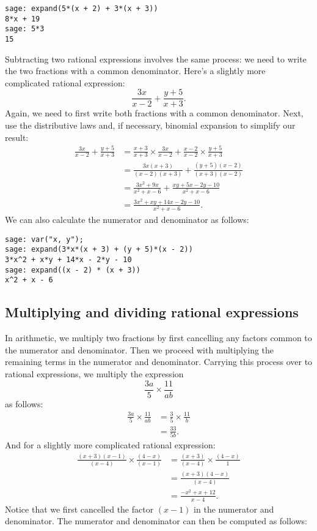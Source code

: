 \begin{lstlisting}
sage: expand(5*(x + 2) + 3*(x + 3))
8*x + 19
sage: 5*3
15
\end{lstlisting}

Subtracting two rational
expressions involves the same process: we need to write the two
fractions with a common denominator. Here's a slightly more
complicated rational expression:
\[
\frac{3x}{x - 2} + \frac{y + 5}{x + 3}.
\]
Again, we need to first write both fractions with a common
denominator. Next, use the distributive laws and, if necessary,
binomial expansion to simplify our result:
%
\begin{align*}
\frac{3x}{x - 2} + \frac{y + 5}{x + 3}
&=
\frac{x + 3}{x + 3} \times \frac{3x}{x - 2}
+
\frac{x - 2}{x - 2} \times \frac{y + 5}{x + 3} \\
&=
\frac{3x(x + 3)}{(x - 2)(x + 3)}
+
\frac{(y + 5)(x - 2)}{(x + 3)(x - 2)} \\
&=
\frac{3x^2 + 9x}{x^2 + x - 6} + \frac{xy + 5x - 2y - 10}{x^2 + x - 6} \\
&=
\frac{3x^2 + xy + 14x - 2y - 10} {x^2 + x - 6}.
\end{align*}
%
We can also calculate the numerator and denominator as follows:

\begin{lstlisting}
sage: var("x, y");
sage: expand(3*x*(x + 3) + (y + 5)*(x - 2))
3*x^2 + x*y + 14*x - 2*y - 10
sage: expand((x - 2) * (x + 3))
x^2 + x - 6
\end{lstlisting}



\subsection{Multiplying and dividing rational expressions}

In arithmetic, we multiply two fractions by first cancelling any
factors common to the numerator and denominator. Then we proceed with
multiplying the remaining terms in the numerator and
denominator. Carrying this process over to rational expressions, we
multiply the expression
\[
\frac{3a}{5} \times \frac{11}{ab}
\]
as follows:
%
\begin{align*}
\frac{3a}{5} \times \frac{11}{ab}
&=
\frac{3}{5} \times \frac{11}{b} \\[4pt]
&=
\frac{33}{5b}.
\end{align*}
%
And for a slightly more complicated rational expression:
%
\begin{align*}
\frac{(x + 3) (x - 1)} {(x - 4)} \times \frac{(4 - x)} {(x - 1)}
&=
\frac{(x + 3)} {(x - 4)} \times \frac{(4 - x)} {1} \\[4pt]
&=
\frac{(x + 3)(4 - x)} {(x - 4)} \\[4pt]
&=
\frac{-x^2 + x + 12} {x - 4}.
\end{align*}
%
Notice that we first cancelled the factor $(x - 1)$ in the numerator
and denominator. The numerator and denominator can then be computed as
follows:

